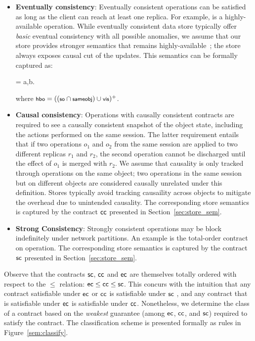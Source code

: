 \begin{itemize}
\setlength{\itemsep}{2pt}

\item \textbf{Eventually consistency}: Eventually consistent operations can be
satisfied as long as the client can reach at least one replica. For example,
 is a highly-available operation. While eventually consistent data
store typically offer \emph{basic} eventual consistency with all possible
anomalies, we assume that our store provides stronger semantics that remains
highly-available~\cite{BailisHAT,COPS}; the store always exposes causal cut of
the updates. This semantics can be formally captured as:

\vspace{-1em}
\begin{smathpar}
\ecc = \forall a,b.  \wedge {} \Rightarrow {}
\end{smathpar}

\noindent where $\small \hboZ = ((\soZ \cap \sameobjZ) \cup \visZ)^+$.

\item \textbf{Causal consistency}: Operations with causally consistent
contracts are required to see a causally consistent snapshot of the object
state, including the actions performed on the same session.  The latter
requirement entails that if two operations $o_1$ and $o_2$ from the same
session are applied to two different replicas $r_1$ and $r_2$, the second
operation cannot be discharged until the effect of $o_1$ is merged with $r_2$.
We assume that causality is only tracked through operations on the same object;
two operations in the same session but on different objects are considered
causally unrelated under this definition. Stores typically avoid tracking
causaility across objects to mitigate the overhead due to unintended causality.
The corresponding store semantics is captured by the contract ${\sf cc}$ presented
in Section~\ref{sec:store_sem}.

\item \textbf{Strong Consistency}: Strongly consistent operations may be block
indefinitely under network partitions. An example is the total-order contract
on  operation. The corresponding store semantics is captured by
the contract ${\sf sc}$ presented in Section~\ref{sec:store_sem}.

\end{itemize}

Observe that the contracts ${\sf sc}$, ${\sf cc}$ and ${\sf ec}$ are themselves totally
ordered with respect to the $\le$ relation: ${\sf ec} \le {\sf cc} \le {\sf sc}$. This
concurs with the intuition that any contract satisfiable under ${\sf ec}$ or ${\sf cc}$
is satisfiable under ${\sf sc}$ , and any contract that is satisfiable under ${\sf ec}$
is satisfiable under ${\sf cc}$. Nonetheless, we determine the class of a contract
based on the \emph{weakest} guarantee (among ${\sf ec}$, ${\sf cc}$, and ${\sf sc}$)
required to satisfy the contract. The classification scheme is presented
formally as rules in Figure~\ref{sem:classify}.

